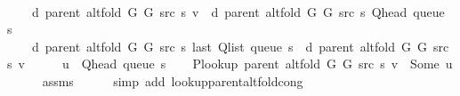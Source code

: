 \begin{isabellebody}
\ \ \isanewline
\ \ \ \ {\isachardoublequoteopen}d\ {\isacharparenleft}{\kern0pt}parent\ {\isacharparenleft}{\kern0pt}alt{\isacharunderscore}{\kern0pt}fold\ G{}\ G{}\ src\ s{\isacharparenright}{\kern0pt}{\isacharparenright}{\kern0pt}\ v\ {\isacharequal}{\kern0pt}\ d\ {\isacharparenleft}{\kern0pt}parent\ {\isacharparenleft}{\kern0pt}alt{\isacharunderscore}{\kern0pt}fold\ G{}\ G{}\ src\ s{\isacharparenright}{\kern0pt}{\isacharparenright}{\kern0pt}\ {\isacharparenleft}{\kern0pt}Q{\isacharunderscore}{\kern0pt}head\ {\isacharparenleft}{\kern0pt}queue\ s{\isacharparenright}{\kern0pt}{\isacharparenright}{\kern0pt}\ {\isacharplus}{\kern0pt}\ {}{\isachardoublequoteclose}\isanewline
\ \ \ \ {\isachardoublequoteopen}d\ {\isacharparenleft}{\kern0pt}parent\ {\isacharparenleft}{\kern0pt}alt{\isacharunderscore}{\kern0pt}fold\ G{}\ G{}\ src\ s{\isacharparenright}{\kern0pt}{\isacharparenright}{\kern0pt}\ {\isacharparenleft}{\kern0pt}last\ {\isacharparenleft}{\kern0pt}Q{\isacharunderscore}{\kern0pt}list\ {\isacharparenleft}{\kern0pt}queue\ s{\isacharparenright}{\kern0pt}{\isacharparenright}{\kern0pt}{\isacharparenright}{\kern0pt}\ {\isasymle}\ d\ {\isacharparenleft}{\kern0pt}parent\ {\isacharparenleft}{\kern0pt}alt{\isacharunderscore}{\kern0pt}fold\ G{}\ G{}\ src\ s{\isacharparenright}{\kern0pt}{\isacharparenright}{\kern0pt}\ v{\isachardoublequoteclose}%
\endisataginvisible
{\isafoldinvisible}%
%
\isadeliminvisible
\isanewline
%
\endisadeliminvisible
%
\isadelimproof
%
\endisadelimproof
%
\isatagproof
{}\isamarkupfalse%
\ {\isacharminus}{\kern0pt}\isanewline
\ \ \isamarkupfalse%
\ {\isacharquery}{\kern0pt}u\ {\isacharequal}{\kern0pt}\ {\isachardoublequoteopen}Q{\isacharunderscore}{\kern0pt}head\ {\isacharparenleft}{\kern0pt}queue\ s{\isacharparenright}{\kern0pt}{\isachardoublequoteclose}\isanewline
\ \ \isamarkupfalse%
\ {\isachardoublequoteopen}P{\isacharunderscore}{\kern0pt}lookup\ {\isacharparenleft}{\kern0pt}parent\ {\isacharparenleft}{\kern0pt}alt{\isacharunderscore}{\kern0pt}fold\ G{}\ G{}\ src\ s{\isacharparenright}{\kern0pt}{\isacharparenright}{\kern0pt}\ v\ {\isacharequal}{\kern0pt}\ Some\ {\isacharquery}{\kern0pt}u{\isachardoublequoteclose}\isanewline
\ \ \ \ \isamarkupfalse%
\ assms\isanewline
\ \ \ \ \isamarkupfalse%
\ {\isacharparenleft}{\kern0pt}simp\ add{\isacharcolon}{\kern0pt}\ lookup{\isacharunderscore}{\kern0pt}parent{\isacharunderscore}{\kern0pt}alt{\isacharunderscore}{\kern0pt}fold{\isacharunderscore}{\kern0pt}cong{\isacharparenright}{\kern0pt}\isanewline

\end{isabellebody}
